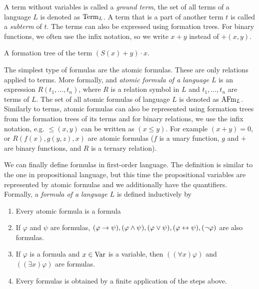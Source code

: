 A term without variables is called a \emph{ground term}, the set of all terms of a language $L$ is denoted as $\operatorname{Term}_L$. A term that is a part of another term $t$ is called a \emph{subterm} of $t$. The terms can also be expressed using formation trees. For binary functions, we often use the infix notation, so we write $x+y$ instead of $+(x,y)$.

\begin{marginfigure}[-6\baselineskip]
\centering
{}
\caption{A formation tree of the term $(S(x) + y)\cdot x$.}
\end{marginfigure}

The simplest type of formulas are the atomic formulas. These are only relations applied to terms. More formally, and \emph{atomic formula of a language $L$} is an expression $R(t_1, \dots, t_n)$, where $R$ is a relation symbol in $L$ and $t_1, \dots, t_n$ are terms of $L$. The set of all atomic formulas of language $L$ is denoted as $\operatorname{AFm}_L$. Similarly to terms, atomic formulas can also be represented using formation trees from the formation trees of its terms and for binary relations, we use the infix notation, e.g. $\leq(x, y)$ can be written as $(x \leq y)$. For example $(x + y) = 0$, or $R(f(x), g(y,z), x)$ are atomic formulas ($f$ is a unary function, $g$ and $+$ are binary functions, and $R$ is a ternary relation).

We can finally define formulas in first-order language. The definition is similar to the one in propositional language, but this time the propositional variables are represented by atomic formulas and we additionally have the quantifiers. Formally, a \emph{formula of a language $L$} is defined inductively by
\begin{enumerate}
  \item Every atomic formula is a formula
  \item If $\varphi$ and $\psi$ are formulas, $(\varphi \to \psi), (\varphi \land \psi), (\varphi \lor \psi), (\varphi \leftrightarrow \psi), (\neg \varphi)$ are also formulas.
  \item If $\varphi$ is a formula and $x \in \operatorname{Var}$ is a variable, then $((\forall x)\varphi)$ and $((\exists x)\varphi)$ are formulas.
  \item Every formulas is obtained by a finite application of the steps above.
\end{enumerate}

